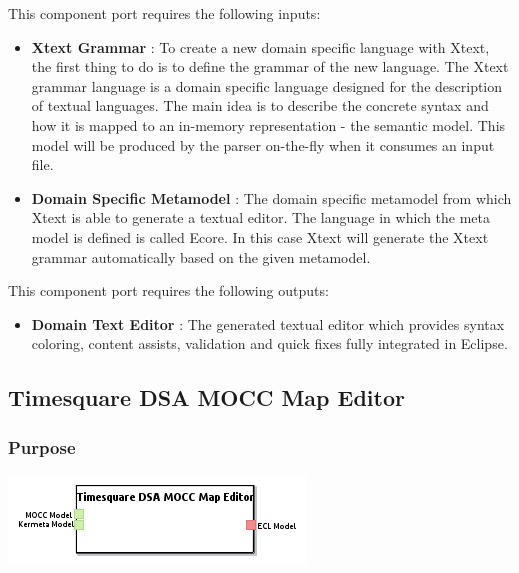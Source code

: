 \documentclass{gemoc} %
\begin{document}
This component port requires the following inputs:
\begin{itemize}
  \item \textbf{Xtext Grammar} :
To create a new domain specific language with Xtext, the first thing to do is to define the grammar of the new language. The Xtext grammar language is a domain specific language designed for the description of textual languages. The main idea is to describe the concrete syntax and how it is mapped to an in-memory representation - the semantic model. This model will be produced by the parser on-the-fly when it consumes an input file.
  \item \textbf{Domain Specific Metamodel} :
The domain specific metamodel from which Xtext is able to generate a textual editor. The language in which the meta model is defined is called Ecore. In this case Xtext will generate the Xtext grammar automatically based on the given metamodel.
\end{itemize}

This component port requires the following outputs:
\begin{itemize}
  \item \textbf{Domain Text Editor} :
The generated textual editor which provides syntax coloring, content assists, validation and quick fixes fully integrated in Eclipse.
\end{itemize}

\subsection{Timesquare DSA MOCC Map Editor}


\subsubsection{Purpose}

\begin{center}
\includegraphics*[trim=0.0cm 0.0cm 0cm 0.0cm, clip=true]{../images/generated/Generated_Timesquare_DSA_MOCC_Map_Editor.png}
\end{center}
\end{document}
